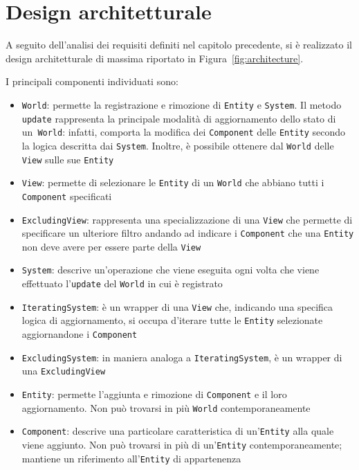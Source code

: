\chapter{Design architetturale}\label{ch:design-architetturale}
A seguito dell'analisi dei requisiti definiti nel capitolo precedente, si è realizzato il design architetturale
di massima riportato in Figura~\ref{fig:architecture}.

I principali componenti individuati sono:
\begin{itemize}
    \item \texttt{World}: permette la registrazione e rimozione di \texttt{Entity} e \texttt{System}.
    Il metodo \texttt{update} rappresenta la principale modalità di aggiornamento dello stato di un~\texttt{World}:
    infatti, comporta la modifica dei \texttt{Component} delle \texttt{Entity} secondo la logica descritta dai
    \texttt{System}.
    Inoltre, è possibile ottenere dal \texttt{World} delle \texttt{View} sulle sue \texttt{Entity}
    \item \texttt{View}: permette di selezionare le \texttt{Entity} di un \texttt{World} che abbiano tutti i
    \texttt{Component} specificati
    \item \texttt{ExcludingView}: rappresenta una specializzazione di una \texttt{View} che permette di specificare un
    ulteriore filtro andando ad indicare i \texttt{Component} che una \texttt{Entity} non deve avere per essere parte
    della \texttt{View}
    \item \texttt{System}: descrive un'operazione che viene eseguita ogni volta che viene effettuato l'\texttt{update}
    del \texttt{World} in cui è registrato
    \item \texttt{IteratingSystem}: è un wrapper di una \texttt{View} che, indicando una specifica logica di
    aggiornamento, si occupa d'iterare tutte le \texttt{Entity} selezionate aggiornandone i \texttt{Component}
    \item \texttt{ExcludingSystem}: in maniera analoga a \texttt{IteratingSystem}, è un wrapper di una
    \texttt{ExcludingView}
    \item \texttt{Entity}: permette l'aggiunta e rimozione di \texttt{Component} e il loro aggiornamento.
    Non può trovarsi in più \texttt{World} contemporaneamente
    \item \texttt{Component}: descrive una particolare caratteristica di un'\texttt{Entity} alla quale viene aggiunto.
    Non può trovarsi in più di un'\texttt{Entity} contemporaneamente;
    mantiene un riferimento all'\texttt{Entity} di appartenenza
\end{itemize}

